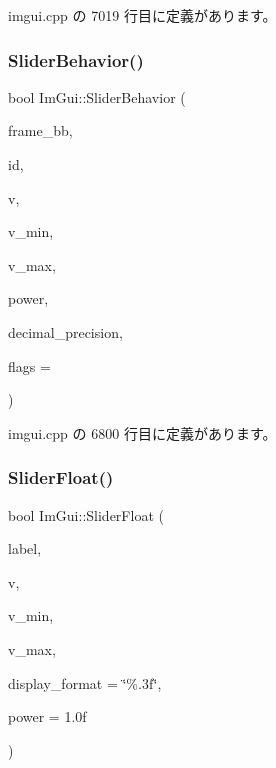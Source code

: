 imgui.\+cpp の 7019 行目に定義があります。

\mbox{\label{namespace_im_gui_a3d3b2964eeba76dadaa532232c23fc97}} 
\subsubsection{\texorpdfstring{Slider\+Behavior()}{SliderBehavior()}}
{\footnotesize\ttfamily bool Im\+Gui\+::\+Slider\+Behavior (\begin{DoxyParamCaption}\item[{const \mbox{\hyperlink{struct_im_rect}{Im\+Rect}} \&}]{frame\+\_\+bb,  }\item[{\mbox{\hyperlink{imgui_8h_a1785c9b6f4e16406764a85f32582236f}{Im\+Gui\+ID}}}]{id,  }\item[{float $\ast$}]{v,  }\item[{float}]{v\+\_\+min,  }\item[{float}]{v\+\_\+max,  }\item[{float}]{power,  }\item[{int}]{decimal\+\_\+precision,  }\item[{\mbox{\hyperlink{imgui__internal_8h_a50cc3e3e4beb155e2186f8c1dc057e18}{Im\+Gui\+Slider\+Flags}}}]{flags = {} }\end{DoxyParamCaption})}



 imgui.\+cpp の 6800 行目に定義があります。

\mbox{\label{namespace_im_gui_a7c12e66f74025376996b7ac6d1e3a476}} 
\subsubsection{\texorpdfstring{Slider\+Float()}{SliderFloat()}}
{\footnotesize\ttfamily bool Im\+Gui\+::\+Slider\+Float (\begin{DoxyParamCaption}\item[{const char $\ast$}]{label,  }\item[{float $\ast$}]{v,  }\item[{float}]{v\+\_\+min,  }\item[{float}]{v\+\_\+max,  }\item[{const char $\ast$}]{display\+\_\+format = {\ttfamily \char`\"{}\%.3f\char`\"{}},  }\item[{float}]{power = {\ttfamily 1.0f} }\end{DoxyParamCaption})}



